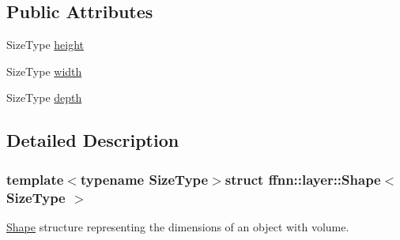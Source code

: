 \subsection*{Public Attributes}
\begin{DoxyCompactItemize}
\item 
Size\-Type \hyperlink{structffnn_1_1layer_1_1_shape_a96608d7bcef7733a1b1f4782827a0c78}{height}
\item 
Size\-Type \hyperlink{structffnn_1_1layer_1_1_shape_a860cbac53d9e20bdf8283298c6369cbc}{width}
\item 
Size\-Type \hyperlink{structffnn_1_1layer_1_1_shape_a37ec3deb8c9f2d6617e6f63799c0fcbf}{depth}
\end{DoxyCompactItemize}


\subsection{Detailed Description}
\subsubsection*{template$<$typename Size\-Type$>$struct ffnn\-::layer\-::\-Shape$<$ Size\-Type $>$}

\hyperlink{structffnn_1_1layer_1_1_shape}{Shape} structure representing the dimensions of an object with volume. 

